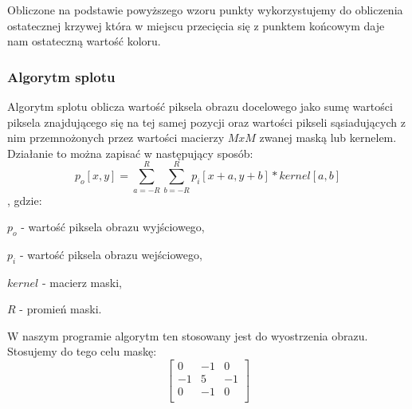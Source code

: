 \documentclass[twoside]{projektInzynierskiMS}
\begin{document}
Obliczone na podstawie powyższego wzoru punkty wykorzystujemy do obliczenia ostatecznej krzywej która w miejscu przecięcia się z punktem końcowym daje nam ostateczną wartość koloru. 

\subsubsection{Algorytm splotu}
Algorytm splotu oblicza wartość piksela obrazu docelowego jako sumę wartości piksela znajdującego się na tej samej pozycji oraz wartości pikseli sąsiadujących z nim przemnożonych przez wartości macierzy $MxM$ zwanej maską lub kernelem. Działanie to można zapisać w następujący sposób: 
\[p_{o}[x,y]= \sum_{a = -R}^{R}\sum_{b = -R}^{R} p_{i}[x + a, y + b]*kernel[a, b]\], gdzie:

$p_{o}$ - wartość piksela obrazu wyjściowego,

$p_{i}$ - wartość piksela obrazu wejściowego,

$kernel$ - macierz maski,

$R$ - promień maski.

W naszym programie algorytm ten stosowany jest do wyostrzenia obrazu. Stosujemy do tego celu maskę: 
\[
\begin{bmatrix}
	0 & -1 & 0\\[0.3em]
	-1 & 5 & -1\\[0.3em]
	0 & -1 & 0\\[0.3em]
\end{bmatrix}
\]
\end{document}

